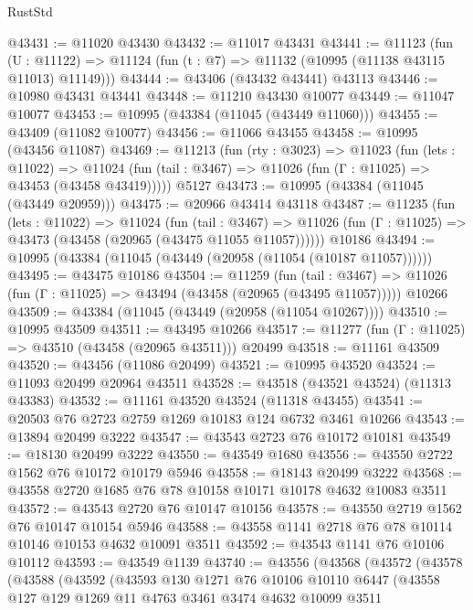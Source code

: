 \begin{lexlean}{RustStd}
\begin{coremodule}
@43431 := @11020 @43430
@43432 := @11017 @43431
@43441 := @11123
    (fun (U : @11122) => @11124 (fun (t : @7) => @11132 (@10995 (@11138 @43115 @11013) @11149)))
@43444 := @43406 (@43432 @43441) @43113
@43446 := @10980 @43431 @43441
@43448 := @11210 @43430 @10077
@43449 := @11047 @10077
@43453 := @10995 (@43384 (@11045 (@43449 @11060)))
@43455 := @43409 (@11082 @10077)
@43456 := @11066 @43455
@43458 := @10995 (@43456 @11087)
@43469 := @11213
    (fun (rty : @3023) =>
    @11023
      (fun (lets : @11022) =>
      @11024 (fun (tail : @3467) => @11026 (fun (Γ : @11025) => @43453 (@43458 @43419)))))
    @5127
@43473 := @10995 (@43384 (@11045 (@43449 @20959)))
@43475 := @20966 @43414 @43118
@43487 := @11235
    (fun (lets : @11022) =>
    @11024
      (fun (tail : @3467) =>
      @11026 (fun (Γ : @11025) => @43473 (@43458 (@20965 (@43475 @11055 @11057))))))
    @10186
@43494 := @10995 (@43384 (@11045 (@43449 (@20958 (@11054 (@10187 @11057))))))
@43495 := @43475 @10186
@43504 := @11259
    (fun (tail : @3467) => @11026 (fun (Γ : @11025) => @43494 (@43458 (@20965 (@43495 @11057)))))
    @10266
@43509 := @43384 (@11045 (@43449 (@20958 (@11054 @10267))))
@43510 := @10995 @43509
@43511 := @43495 @10266
@43517 := @11277 (fun (Γ : @11025) => @43510 (@43458 (@20965 @43511))) @20499
@43518 := @11161 @43509
@43520 := @43456 (@11086 @20499)
@43521 := @10995 @43520
@43524 := @11093 @20499 @20964 @43511
@43528 := @43518 (@43521 @43524) (@11313 @43383)
@43532 := @11161 @43520 @43524 (@11318 @43455)
@43541 := @20503 @76 @2723 @2759 @1269 @10183 @124 @6732 @3461 @10266
@43543 := @13894 @20499 @3222
@43547 := @43543 @2723 @76 @10172 @10181
@43549 := @18130 @20499 @3222
@43550 := @43549 @1680
@43556 := @43550 @2722 @1562 @76 @10172 @10179 @5946
@43558 := @18143 @20499 @3222
@43568 := @43558 @2720 @1685 @76 @78 @10158 @10171 @10178 @4632 @10083 @3511
@43572 := @43543 @2720 @76 @10147 @10156
@43578 := @43550 @2719 @1562 @76 @10147 @10154 @5946
@43588 := @43558 @1141 @2718 @76 @78 @10114 @10146 @10153 @4632 @10091 @3511
@43592 := @43543 @1141 @76 @10106 @10112
@43593 := @43549 @1139
@43740 := @43556
    (@43568
      (@43572
        (@43578
          (@43588
            (@43592
              (@43593
                @130
                @1271
                @76
                @10106
                @10110
                @6447
                (@43558
                  @127
                  @129
                  @1269
                  @11
                  @4763
                  @3461
                  @3474
                  @4632
                  @10099
                  @3511

\end{coremodule}
\end{lexlean}
